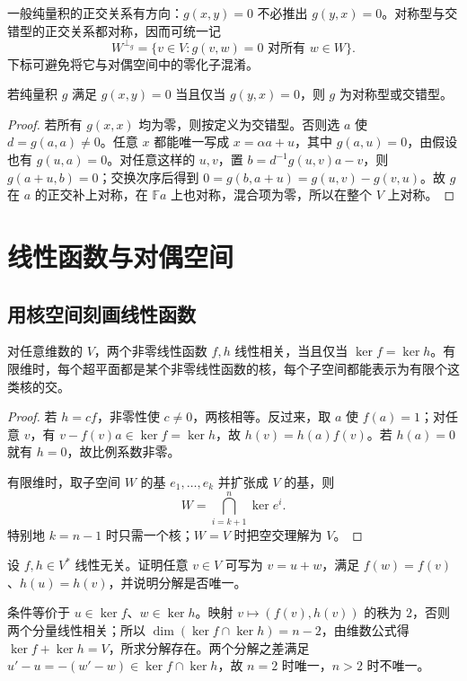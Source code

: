 一般纯量积的正交关系有方向：$g(x,y)=0$ 不必推出 $g(y,x)=0$。对称型与交错型的正交关系都对称，因而可统一记
\[
 W^{\perp_g}=\{v\in V:g(v,w)=0\text{ 对所有 }w\in W\}.
\]
下标可避免将它与对偶空间中的零化子混淆。

\begin{proposition}
\label{prop:laex-reciprocal-orthogonality}
若纯量积 $g$ 满足 $g(x,y)=0$ 当且仅当 $g(y,x)=0$，则 $g$ 为对称型或交错型。
\end{proposition}
\begin{proof}
若所有 $g(x,x)$ 均为零，则按定义为交错型。否则选 $a$ 使 $d=g(a,a)\ne0$。任意 $x$ 都能唯一写成 $x=\alpha a+u$，其中 $g(a,u)=0$，由假设也有 $g(u,a)=0$。对任意这样的 $u,v$，置 $b=d^{-1}g(u,v)a-v$，则 $g(a+u,b)=0$；交换次序后得到 $0=g(b,a+u)=g(u,v)-g(v,u)$。故 $g$ 在 $a$ 的正交补上对称，在 $\mathbb Fa$ 上也对称，混合项为零，所以在整个 $V$ 上对称。
\end{proof}

\section{线性函数与对偶空间}
\label{sec:laex-dual-methods}

\subsection{用核空间刻画线性函数}

\begin{proposition}
\label{prop:laex-functional-kernels}
对任意维数的 $V$，两个非零线性函数 $f,h$ 线性相关，当且仅当 $\ker f=\ker h$。有限维时，每个超平面都是某个非零线性函数的核，每个子空间都能表示为有限个这类核的交。
\end{proposition}
\begin{proof}
若 $h=cf$，非零性使 $c\ne0$，两核相等。反过来，取 $a$ 使 $f(a)=1$；对任意 $v$，有 $v-f(v)a\in\ker f=\ker h$，故 $h(v)=h(a)f(v)$。若 $h(a)=0$ 就有 $h=0$，故比例系数非零。

有限维时，取子空间 $W$ 的基 $e_1,\ldots,e_k$ 并扩张成 $V$ 的基，则
\[
 W=\bigcap_{i=k+1}^n\ker e^i.
\]
特别地 $k=n-1$ 时只需一个核；$W=V$ 时把空交理解为 $V$。
\end{proof}

\begin{example}
\label{ex:laex-functional-decomposition}
设 $f,h\in V^*$ 线性无关。证明任意 $v\in V$ 可写为 $v=u+w$，满足 $f(w)=f(v)$、$h(u)=h(v)$，并说明分解是否唯一。
\end{example}
\begin{solve}
条件等价于 $u\in\ker f$、$w\in\ker h$。映射 $v\mapsto(f(v),h(v))$ 的秩为 $2$，否则两个分量线性相关；所以 $\dim(\ker f\cap\ker h)=n-2$，由维数公式得 $\ker f+\ker h=V$，所求分解存在。两个分解之差满足 $u'-u=-(w'-w)\in\ker f\cap\ker h$，故 $n=2$ 时唯一，$n>2$ 时不唯一。
\end{solve}


